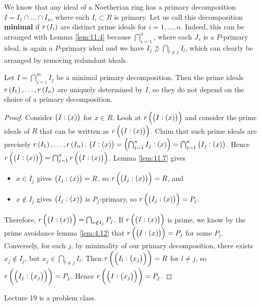 We know that any ideal of a Noetherian ring has a primary decomposition $ I = I_1 \cap \dots \cap I_n $, where each $ I_i \subset R $ is primary. Let us call this decomposition \textbf{minimal} if $ r\br{I_i} $ are distinct prime ideals for $ i = 1, \dots, n $. Indeed, this can be arranged with Lemma \ref{lem:11.4} because $ \bigcap_{s = 1}^n $, where each $ J_s $ is a $ P $-primary ideal, is again a $ P $-primary ideal and we have $ I_j \not\supset \bigcap_{l \ne j} I_l $, which can clearly be arranged by removing redundant ideals.

\begin{theorem}
Let $ I = \bigcap_{j = i}^m I_j $ be a minimal primary decomposition. Then the prime ideals $ r\br{I_1}, \dots, r\br{I_n} $ are uniquely determined by $ I $, so they do not depend on the choice of a primary decomposition.
\end{theorem}

\begin{proof}
Consider $ \br{I : \br{x}} $ for $ x \in R $. Look at $ r\br{\br{I : \br{x}}} $ and consider the prime ideals of $ R $ that can be written as $ r\br{\br{I : \br{x}}} $. Claim that such prime ideals are precisely $ r\br{I_1}, \dots, r\br{I_n} $. $ \br{I : \br{x}} = \br{\bigcap_{j = 1}^n I_j : \br{x}} = \bigcap_{j = 1}^n \br{I_j : \br{x}} $. Hence $ r\br{\br{I : \br{x}}} = \bigcap_{j = 1}^n r\br{\br{I : \br{x}}} $. Lemma \ref{lem:11.7} gives
\begin{itemize}
\item $ x \in I_j $ gives $ \br{I_j : \br{x}} = R $, so $ r\br{\br{I_j : \br{x}}} = R $, and
\item $ x \notin I_j $ gives $ \br{I_j : \br{x}} $ is $ P_j $-primary, so $ r\br{\br{I_j : \br{x}}} = P_j $.
\end{itemize}
Therefore, $ r\br{\br{I : \br{x}}} = \bigcap_{x \notin I_j} P_j $. If $ r\br{\br{I : \br{x}}} $ is prime, we know by the prime avoidance lemma \ref{lem:4.12} that $ r\br{\br{I : \br{x}}} = P_j $ for some $ P_j $. Conversely, for each $ j $, by minimality of our primary decomposition, there exists $ x_j \notin I_j $, but $ x_j \in \bigcap_{l \ne j} I_l $. Then $ r\br{\br{I_l : \br{x_j}}} = R $ for $ l \ne j $, so $ r\br{\br{I_j : \br{x_j}}} = P_j $. Hence $ r\br{\br{I : \br{x_j}}} = P_j $.
\end{proof}


Lecture 19 is a problem class.

